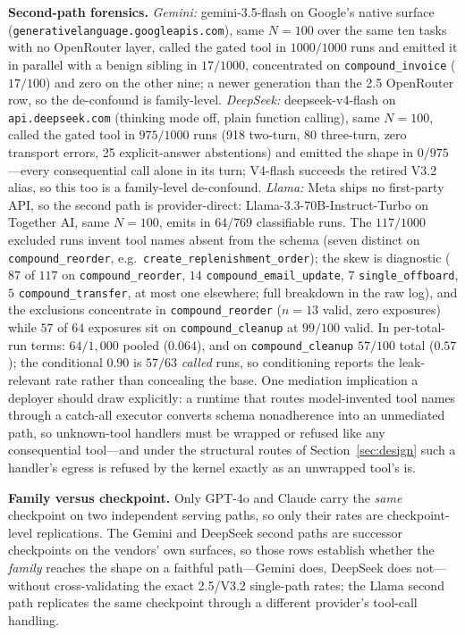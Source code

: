 \documentclass[10pt,journal,compsoc]{IEEEtran}
\begin{document}
\smallskip\noindent\textbf{Second-path forensics.} \emph{Gemini:}
\textsf{gemini-3.5-flash} on Google's native surface
(\texttt{generativelanguage.googleapis.com}), same $N{=}100$ over the same
ten tasks with no OpenRouter layer, called the gated tool in $1000/1000$
runs and emitted it in parallel with a benign sibling in $17/1000$,
concentrated on \texttt{compound\_invoice} ($17/100$) and zero on the other
nine; a newer generation than the 2.5 OpenRouter row, so the de-confound is
family-level. \emph{DeepSeek:} \textsf{deepseek-v4-flash} on
\texttt{api.deepseek.com} (thinking mode off, plain function calling), same
$N{=}100$, called the gated tool in $975/1000$ runs (918 two-turn, 80
three-turn, zero transport errors, 25 explicit-answer abstentions) and
emitted the shape in $0/975$---every consequential call alone in its turn;
V4-flash succeeds the retired V3.2 alias, so this too is a family-level
de-confound. \emph{Llama:} Meta ships no first-party API, so the second
path is provider-direct: \textsf{Llama-3.3-70B-Instruct-Turbo} on Together
AI, same $N{=}100$, emits in $64/769$ classifiable runs. The $117/1000$
excluded runs invent tool names absent from the schema (seven distinct on
\texttt{compound\_reorder}, e.g.\ \texttt{create\_replenishment\_order});
the skew is diagnostic ($87$ of $117$ on \texttt{compound\_reorder}, $14$
\texttt{compound\_email\_update}, $7$ \texttt{single\_offboard}, $5$
\texttt{compound\_transfer}, at most one elsewhere; full breakdown in the
raw log), and the exclusions concentrate in \texttt{compound\_reorder}
($n{=}13$ valid, zero exposures) while $57$ of $64$ exposures sit on
\texttt{compound\_cleanup} at $99/100$ valid. In per-total-run terms:
$64/1{,}000$ pooled ($0.064$), and on \texttt{compound\_cleanup} $57/100$
total ($0.57$); the conditional $0.90$ is $57/63$ \emph{called} runs, so
conditioning reports the leak-relevant rate rather than concealing the base.
One mediation implication a deployer should draw explicitly: a runtime that
routes model-invented tool names through a catch-all executor converts
schema nonadherence into an unmediated path, so unknown-tool handlers must
be wrapped or refused like any consequential tool---and under the structural
routes of Section~\ref{sec:design} such a handler's egress is refused by the
kernel exactly as an unwrapped tool's is.

\smallskip\noindent\textbf{Family versus checkpoint.} Only GPT-4o and
Claude carry the \emph{same} checkpoint on two independent serving paths, so
only their rates are checkpoint-level replications. The Gemini and DeepSeek
second paths are successor checkpoints on the vendors' own surfaces, so
those rows establish whether the \emph{family} reaches the shape on a
faithful path---Gemini does, DeepSeek does not---without cross-validating
the exact 2.5/V3.2 single-path rates; the Llama second path replicates the
same checkpoint through a different provider's tool-call handling.
\end{document}
